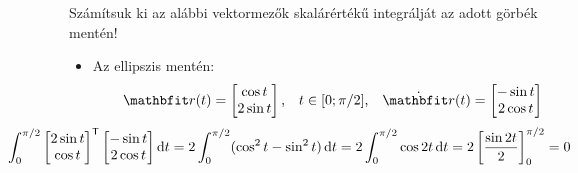 \documentclass[exercise]{math-standalone}
\begin{document}
\begin{exercise}{Számítsuk ki az alábbi vektormezők skalárértékű integrálját az adott görbék mentén!}
{\begin{enumerate}[a)]
\begin{itemize}[i)]
              \item Az ellipszis mentén:
                    \[
                      \rvec r(t) = \begin{bmatrix}
                        \cos t \\ 2 \sin t
                      \end{bmatrix}
                      \text,\quad
                      t \in [0; \pi/2]
                      \text,\quad
                      \dot{\rvec r}(t) = \begin{bmatrix}
                        - \sin t \\ 2 \cos t
                      \end{bmatrix}
                    \]
                    \[
                      \hspace{-2.2cm}
                      \int_0^{\pi / 2} \begin{bmatrix}
                        2 \sin t \\ \cos t
                      \end{bmatrix}^\transpose
                      \begin{bmatrix}
                        - \sin t \\ 2 \cos t
                      \end{bmatrix}
                      \diff t
                      = 2 \int_0^{\pi / 2} (\cos^2 t - \sin^2 t) \, \diff t
                      = 2 \int_0^{\pi / 2} \cos 2t \, \diff t
                      = 2 \left[ \frac{\sin 2t}{2} \right]_0^{\pi / 2}
                      = 0
                    \]
            \end{itemize}
    \end{enumerate}
  }
\end{exercise}
\end{document}
